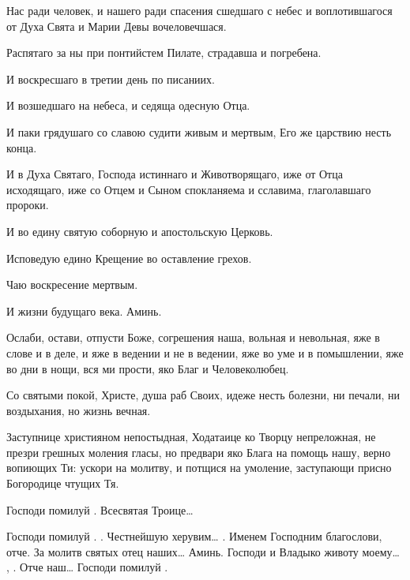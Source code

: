 \begin{mymulticols}
Нас ради человек, и нашего ради спасения сшедшаго с небес и воплотившагося от Духа Свята и Марии Девы вочеловечшася.

Распятаго за ны при понтийстем Пилате, страдавша и погребена.

И воскресшаго в третии день по писаниих.

И возшедшаго на небеса, и седяща одесную Отца.

И паки грядушаго со славою судити живым и мертвым, Его же царствию несть конца.


И в Духа Святаго, Господа истиннаго и Животворящаго, иже от Отца исходящаго, иже со Отцем и Сыном спокланяема и сславима, глаголавшаго пророки.

И во едину святую соборную и апостольскую Церковь.

Исповедую едино Крещение во оставление грехов.

Чаю воскресение мертвым.

И жизни будущаго века. Аминь.


 Ослаби, остави, отпусти Боже, согрешения наша, вольная и невольная, яже в слове и в деле, и яже в ведении и не в ведении, яже во уме и в помышлении, яже во дни в нощи, вся ми прости, яко Благ и Человеколюбец.



 Со святыми покой, Христе, душа раб Своих, идеже несть болезни, ни печали, ни воздыхания, но жизнь вечная.

 Заступнице християном непостыдная, Ходатаице ко Творцу непреложная, не презри грешных моления гласы, но предвари яко Блага на помощь нашу, верно вопиющих Ти: ускори на молитву, и потщися на умоление, заступающи присно Богородице чтущих Тя. 

Господи помилуй .  Всесвятая Троице…


 Господи помилуй . . Честнейшую херувим… . Именем Господним благослови, отче. За молитв святых отец наших… Аминь.  Господи и Владыко животу моему… , .  Отче наш… Господи помилуй .



\end{mymulticols}
